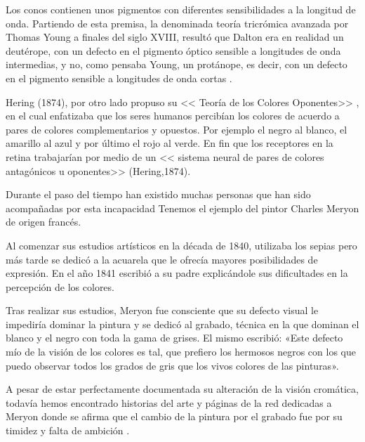 \documentclass[10pt]{article}
\begin{document}
\setlength{\parskip}{2mm}

Los conos contienen unos pigmentos con diferentes sensibilidades a la longitud de onda. Partiendo de esta premisa, la denominada teoría tricrómica avanzada por Thomas Young a finales del siglo XVIII, resultó que Dalton era en realidad un deutérope, con un defecto en el pigmento óptico sensible a longitudes de onda intermedias, y no, como pensaba Young, un protánope, es decir, con un defecto en el pigmento sensible a longitudes de onda cortas \cite{IEEEreferencias:Ref3}.

\setlength{\parskip}{2mm}

Hering (1874), por otro lado propuso su << Teoría de los Colores Oponentes>> , en el cual enfatizaba que los seres humanos percibían los colores de acuerdo a pares de colores complementarios y opuestos. Por ejemplo el negro al blanco, el amarillo al azul y por último el rojo al verde. En fin que los receptores en la retina trabajarían por medio de un << sistema neural de pares de colores antagónicos u oponentes>> (Hering,1874)\cite{IEEEreferencias:Ref4}.

\setlength{\parskip}{2mm}

Durante el paso del tiempo han existido muchas personas que han sido acompañadas por esta incapacidad 
Tenemos el ejemplo del pintor Charles Meryon de origen francés.

\setlength{\parskip}{2mm}

Al comenzar sus estudios artísticos en la década de 1840, utilizaba los sepias pero más tarde se dedicó a la acuarela que le ofrecía mayores posibilidades de expresión. En el año 1841 escribió a su padre explicándole sus dificultades en la percepción de los colores.

\setlength{\parskip}{2mm}

Tras realizar sus estudios, Meryon fue consciente que su defecto visual le impediría dominar la pintura y se dedicó al grabado, técnica en la que dominan el blanco y el negro con toda la gama de grises. El mismo escribió: «Este defecto mío de la visión de los colores es tal, que prefiero los hermosos negros con los que puedo observar todos los grados de gris que los vivos colores de las pinturas».

\setlength{\parskip}{2mm}

A pesar de estar perfectamente documentada su alteración de la visión cromática, todavía hemos encontrado historias del arte y páginas de la red dedicadas a Meryon donde se afirma que el cambio de la pintura por el grabado fue por su timidez y falta de ambición \cite{IEEEreferencias:Ref5}.
\end{document}
